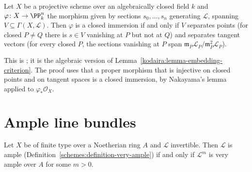 \begin{proposition}\label{divisors:proposition-closed-immersion-criterion}
Let $X$ be a projective scheme over an algebraically closed field $k$ and $\varphi \colon X \to \PP^n_k$ the morphism given by sections $s_0, \ldots, s_n$ generating
$\mathcal{L}$, spanning $V \subseteq \Gamma(X, \mathcal{L})$. Then $\varphi$ is a closed immersion if and only if $V$ separates points (for closed $P \neq Q$ there is $s \in V$
vanishing at $P$ but not at $Q$) and separates tangent vectors (for every closed $P$, the sections vanishing at $P$ span $\mathfrak{m}_P\mathcal{L}_P/\mathfrak{m}_P^2\mathcal{L}_P$).
\end{proposition}

This is \cite[Proposition II.7.3]{hartshorne-ag}; it is the algebraic version of Lemma~\ref{kodaira:lemma-embedding-criterion}. The proof uses that a proper
morphism that is injective on closed points and on tangent spaces is a closed immersion, by Nakayama's lemma applied to $\varphi_*\mathcal{O}_X$.

\section{Ample line bundles}\label{divisors:section-ample}

\begin{theorem}\label{divisors:theorem-ample-very-ample}
Let $X$ be of finite type over a Noetherian ring $A$ and $\mathcal{L}$ invertible. Then $\mathcal{L}$ is ample (Definition~\ref{schemes:definition-very-ample}) if and only
if $\mathcal{L}^m$ is very ample over $A$ for some $m > 0$.
\end{theorem}

